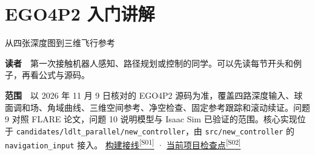 \documentclass[11pt,a4paper]{article}
\numberwithin{equation}{topic}
\newcommand{\sourceref}[2]{\hyperlink{source-#1}{#2\textsuperscript{[#1]}}}
\begin{document}
\section*{EGO4P2 入门讲解}
{\large 从四张深度图到三维飞行参考}\par


\textbf{读者}　第一次接触机器人感知、路径规划或控制的同学。可以先读每节开头和例子，再看公式与源码。

\textbf{范围}　以 2026 年 11 月 9 日核对的 EGO4P2 源码为准，覆盖四路深度输入、球面调和场、角域曲线、三维空间参考、净空检查、固定参考跟踪和滚动续证。问题 9 对照 FLARE 论文，问题 10 说明模型与 Isaac Sim 已验证的范围。核心实现位于 \texttt{candidates/ldlt\_parallel/new\_controller}，由 \texttt{src/new\_controller} 的 \texttt{navigation\_input} 接入。 \sourceref{S01}{构建接线} · \sourceref{S02}{当前项目检查点}
\end{document}
